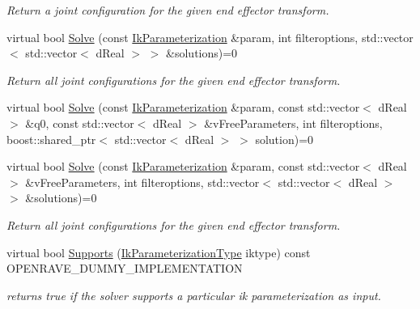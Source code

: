\begin{DoxyCompactItemize}
\begin{DoxyCompactList}\small\item\em Return a joint configuration for the given end effector transform. \item\end{DoxyCompactList}\item 
virtual bool \hyperlink{classOpenRAVE_1_1IkSolverBase_ae0819c42f7769a51d4ff0179c0de1d4b}{Solve} (const \hyperlink{classOpenRAVE_1_1IkParameterization}{IkParameterization} \&param, int filteroptions, std::vector$<$ std::vector$<$ dReal $>$ $>$ \&solutions)=0
\begin{DoxyCompactList}\small\item\em Return all joint configurations for the given end effector transform. \item\end{DoxyCompactList}\item 
virtual bool \hyperlink{classOpenRAVE_1_1IkSolverBase_a6fbb4a98f8ca339a41d7c746f397a664}{Solve} (const \hyperlink{classOpenRAVE_1_1IkParameterization}{IkParameterization} \&param, const std::vector$<$ dReal $>$ \&q0, const std::vector$<$ dReal $>$ \&vFreeParameters, int filteroptions, boost::shared\_\-ptr$<$ std::vector$<$ dReal $>$ $>$ solution)=0
\item 
virtual bool \hyperlink{classOpenRAVE_1_1IkSolverBase_a4f2dd26ce9c4f52cc27f09545faa159b}{Solve} (const \hyperlink{classOpenRAVE_1_1IkParameterization}{IkParameterization} \&param, const std::vector$<$ dReal $>$ \&vFreeParameters, int filteroptions, std::vector$<$ std::vector$<$ dReal $>$ $>$ \&solutions)=0
\begin{DoxyCompactList}\small\item\em Return all joint configurations for the given end effector transform. \item\end{DoxyCompactList}\item 
\hypertarget{classOpenRAVE_1_1IkSolverBase_a4c62d8c5ff1843c169edf6520a05aab0}{
virtual bool \hyperlink{classOpenRAVE_1_1IkSolverBase_a4c62d8c5ff1843c169edf6520a05aab0}{Supports} (\hyperlink{namespaceOpenRAVE_a16f7833e516a35d385ac594a44e44a2e}{IkParameterizationType} iktype) const OPENRAVE\_\-DUMMY\_\-IMPLEMENTATION}
\label{classOpenRAVE_1_1IkSolverBase_a4c62d8c5ff1843c169edf6520a05aab0}

\begin{DoxyCompactList}\small\item\em returns true if the solver supports a particular ik parameterization as input. \item\end{DoxyCompactList}\end{DoxyCompactItemize}
